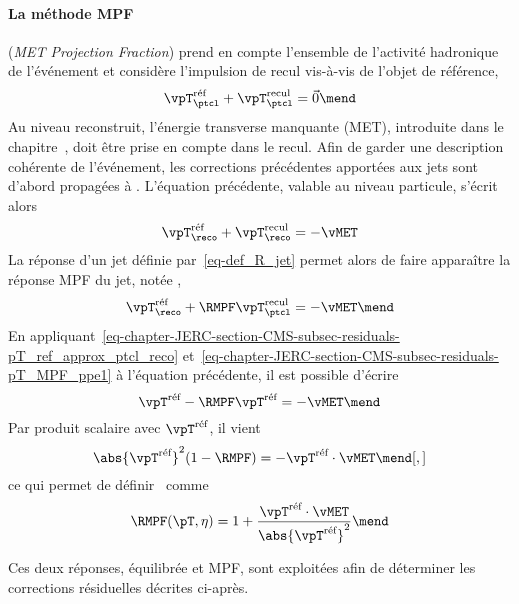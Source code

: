 \paragraph{La méthode \og MPF \fg} (\emph{MET Projection Fraction}) prend en compte l'ensemble de l'activité hadronique de l'événement et considère l'impulsion de recul vis-à-vis de l'objet de référence, \ie
\begin{equation}
\vpT_\ptcl^\text{réf} + \vpT_\ptcl^\text{recul} = \vec{0}
\mend
\label{eq-chapter-JERC-section-CMS-subsec-residuals-pT_MPF_ppe1}
\end{equation}
Au niveau reconstruit, l'énergie transverse manquante (MET), introduite dans le chapitre~, doit être prise en compte dans le recul.
Afin de garder une description cohérente de l'événement, les corrections précédentes apportées aux jets sont d'abord propagées à \vMET.
L'équation précédente, valable au niveau particule, s'écrit alors
\begin{equation}
\vpT_\reco^\text{réf} + \vpT_\reco^\text{recul} = -\vMET
\end{equation}
La réponse d'un jet définie par~\eqref{eq-def_R_jet} permet alors de faire apparaître la réponse MPF du jet, notée \RMPF,
\begin{equation}
\vpT_\reco^\text{réf} + \RMPF\vpT_\ptcl^\text{recul} = -\vMET
\mend
\end{equation}
En appliquant~\eqref{eq-chapter-JERC-section-CMS-subsec-residuals-pT_ref_approx_ptcl_reco} et~\eqref{eq-chapter-JERC-section-CMS-subsec-residuals-pT_MPF_ppe1} à l'équation précédente, il est possible d'écrire
\begin{equation}
\vpT^\text{réf} - \RMPF\vpT^\text{réf} = -\vMET
\mend
\end{equation}
Par produit scalaire avec $\vpT^\text{réf}$, il vient
\begin{equation}
\abs{\vpT^\text{réf}}^2 (1-\RMPF) = -\vpT^\text{réf}\cdot\vMET
\mend[,]
\end{equation}
ce qui permet de définir \RMPF\ comme
\begin{equation}
\RMPF (\pT, \eta) = 1 + \frac{\vpT^\text{réf}\cdot\vMET}{\abs{\vpT^\text{réf}}^2}
\mend
\end{equation}
\par
Ces deux réponses, équilibrée et MPF, sont exploitées afin de déterminer les corrections résiduelles décrites ci-après.

